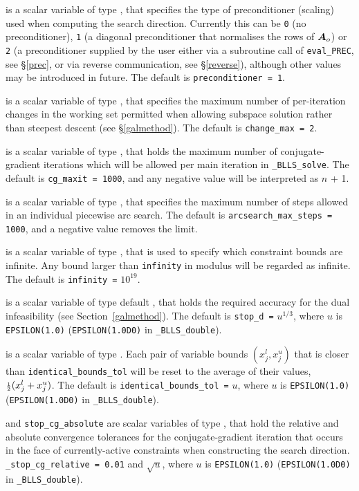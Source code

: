 \documentclass{galahad}
\newcommand{\packagename}{BLLS}
\newcommand{\fullpackagename}{\libraryname\_\packagename}
\newcommand{\solver}{{\tt \fullpackagename\_solve}}
\begin{document}
\begin{description}
 is a scalar variable of type \integer, that
specifies the type of preconditioner (scaling) used when computing the
search direction. Currently this can be 
{\tt 0} (no preconditioner), 
{\tt 1} (a diagonal preconditioner that normalises the rows of ${\bm{A}}_o$) or
{\tt 2} (a preconditioner supplied by the user either via a subroutine
call of {\tt eval\_PREC}, see \S\ref{prec}, or via reverse communication, 
see \S\ref{reverse}),
although other values may be introduced
in future. The default is {\tt preconditioner = 1}.

 is a scalar variable of type \integer, that
specifies the maximum number of per-iteration changes in the working set
permitted when allowing subspace solution rather than steepest descent
(see \S\ref{galmethod}).
The default is {\tt change\_max = 2}.

 is a scalar variable of type \integer, that holds the
maximum number of conjugate-gradient iterations which will be allowed
per main iteration in \solver.
The default is {\tt cg\_maxit = 1000}, and any negative value will
be interpreted as $n$ + 1.

 is a scalar variable of type \integer,
that specifies the maximum number of steps allowed in an individual
piecewise arc search.
The default is {\tt arcsearch\_max\_steps = 1000}, and a negative value
removes the limit.

 is a scalar variable of type \realdp, that is used to
specify which constraint bounds are infinite.
Any bound larger than {\tt infinity} in modulus will be regarded as infinite.
The default is {\tt infinity =} $10^{19}$.

 is a scalar variable of type default
\realdp, that holds the
required accuracy for the dual infeasibility (see Section~\ref{galmethod}).
The default is {\tt stop\_d =} $u^{1/3}$,
where $u$ is {\tt EPSILON(1.0)} ({\tt EPSILON(1.0D0)} in
{\tt \fullpackagename\_double}).

is a scalar variable of type \realdp.
Each pair of variable bounds $(x_{j}^{l}, x_{j}^{u})$
that is closer than {\tt identical\_bounds\_tol}
will be reset to the average of their values,
${\scriptstyle \frac{1}{2}} (x_{j}^{l} + x_{j}^{u})$.
The default is {\tt identical\_bounds\_tol =} $u$,
where $u$ is {\tt EPSILON(1.0)} ({\tt EPSILON(1.0D0)} in
{\tt \fullpackagename\_double}).

 and {\tt stop\_cg\_absolute}
are scalar variables of type \realdp,
that hold the relative and absolute convergence tolerances for the
conjugate-gradient iteration that occurs in the face of currently-active
constraints when constructing the search direction.
{\tt \_stop\_cg\_relative = 0.01}
and  $\sqrt{u}$,
where $u$ is {\tt EPSILON(1.0)} ({\tt EPSILON(1.0D0)} in
{\tt \fullpackagename\_double}).


\end{description}
\end{document}
